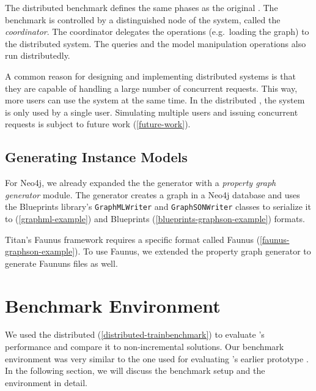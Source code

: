 The distributed benchmark defines the same phases as the original \tb{}. The benchmark is controlled by a distinguished node of the system, called the \emph{coordinator}. The coordinator delegates the operations (e.g.\ loading the graph) to the distributed system. The queries and the model manipulation operations also run distributedly.


A common reason for designing and implementing distributed systems is that they are capable of handling a large number of concurrent requests. This way, more users can use the system at the same time. In the distributed \tb{}, the system is only used by a single user. Simulating multiple users and issuing concurrent requests is subject to future work (\autoref{future-work}).

\subsection{Generating Instance Models}

For Neo4j, we already expanded the the generator with a \emph{property graph generator} module. The generator creates a graph in a Neo4j database and uses the Blueprints library's \texttt{GraphMLWriter} and \texttt{GraphSONWriter} classes to serialize it to \graphml{} (\autoref{graphml-example}) and Blueprints \graphson{} (\autoref{blueprints-graphson-example}) formats. 

Titan's Faunus framework requires a specific format called Faunus \graphson{} (\autoref{faunus-graphson-example}). To use Faunus, we extended the property graph generator to generate Faununs \graphson{} files as well.


\section{Benchmark Environment}
\label{sec:benchmark-environment}

We used the distributed \tb{} (\autoref{distributed-trainbenchmark}) to evaluate \iqd{}'s performance and compare it to non-incremental solutions. Our benchmark environment was very similar to the one used for evaluating \iqd{}'s earlier prototype \cite{Izso:2013:IIG:2487766.2487772}. In the following section, we will discuss the benchmark setup and the environment in detail.

